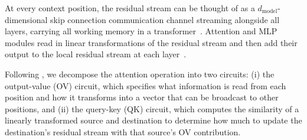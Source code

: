\documentclass{article}
\theoremstyle{plain}
\theoremstyle{definition}
\theoremstyle{remark}
\begin{document}
At every context position, the residual stream can be thought of as a $d_\text{model}$-dimensional skip connection 
communication channel streaming alongside all layers,
carrying all working memory in a transformer~\cite{elhage2021mathematical}.  
Attention and MLP modules read in linear transformations of the residual stream and then add their output to the local residual stream at each layer~\cite{vaswani2017attention}.

Following \cite{elhage2021mathematical}, we decompose the attention operation into two circuits: 
(i) the output-value (OV) circuit, which specifies what information is read from each position and how it transforms into a vector that can be broadcast to other positions, and 
(ii) the query-key (QK) circuit, which 
computes the similarity of 
a linearly transformed source and destination to
determine how much to update the destination's residual stream with that source's OV contribution. 
	




\end{document}
